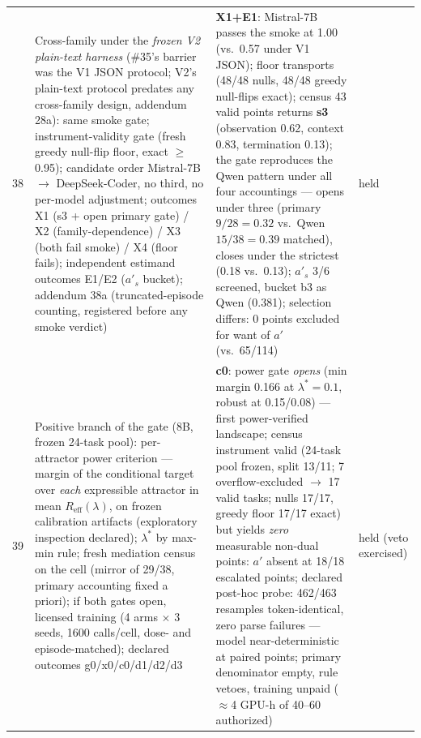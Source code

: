 \documentclass{article}
\theoremstyle{remark}
\begin{document}
\begin{table}[h]
{\begin{tabular}{clll}
38 & Cross-family under the \emph{frozen V2 plain-text harness} (\#35's barrier was the V1 JSON protocol; V2's plain-text protocol predates any cross-family design, addendum 28a): same smoke gate; instrument-validity gate (fresh greedy null-flip floor, exact $\geq$0.95); candidate order Mistral-7B $\to$ DeepSeek-Coder, no third, no per-model adjustment; outcomes X1 (s3 + open primary gate) / X2 (family-dependence) / X3 (both fail smoke) / X4 (floor fails); independent estimand outcomes E1/E2 ($a'_s$ bucket); addendum 38a (truncated-episode counting, registered before any smoke verdict) & \textbf{X1+E1}: Mistral-7B passes the smoke at 1.00 (vs.\ 0.57 under V1 JSON); floor transports (48/48 nulls, 48/48 greedy null-flips exact); census 43 valid points returns \textbf{s3} (observation 0.62, context 0.83, termination 0.13); the gate reproduces the Qwen pattern under all four accountings --- opens under three (primary $9/28=0.32$ vs.\ Qwen $15/38=0.39$ matched), closes under the strictest (0.18 vs.\ 0.13); $a'_s$ 3/6 screened, bucket b3 as Qwen (0.381); selection differs: 0 points excluded for want of $a'$ (vs.\ 65/114) & held \\
39 & Positive branch of the gate (8B, frozen 24-task pool): per-attractor power criterion --- margin of the conditional target over \emph{each} expressible attractor in mean $R_{\text{eff}}(\lambda)$, on frozen calibration artifacts (exploratory inspection declared); $\lambda^{*}$ by max-min rule; fresh mediation census on the cell (mirror of 29/38, primary accounting fixed a priori); if both gates open, licensed training (4 arms $\times$ 3 seeds, 1600 calls/cell, dose- and episode-matched); declared outcomes g0/x0/c0/d1/d2/d3 & \textbf{c0}: power gate \emph{opens} (min margin 0.166 at $\lambda^{*}=0.1$, robust at 0.15/0.08) --- first power-verified landscape; census instrument valid (24-task pool frozen, split 13/11; 7 overflow-excluded $\to$ 17 valid tasks; nulls 17/17, greedy floor 17/17 exact) but yields \emph{zero} measurable non-dual points: $a'$ absent at 18/18 escalated points; declared post-hoc probe: 462/463 resamples token-identical, zero parse failures --- model near-deterministic at paired points; primary denominator empty, rule vetoes, training unpaid ($\approx$4 GPU-h of 40--60 authorized) & held (veto exercised) \\

\end{tabular}}
\end{table}
\end{document}
